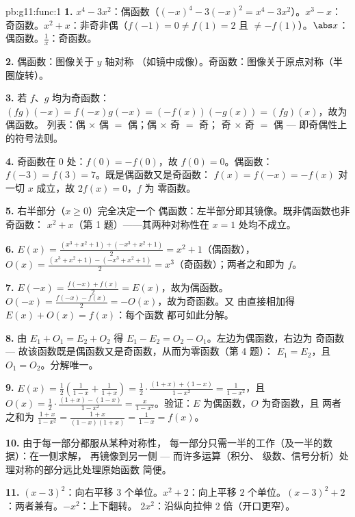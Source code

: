 \begin{solution}{pb:g11:func:1}
\textbf{1.} $x^4 - 3x^2$：偶函数（$(-x)^4 - 3(-x)^2 = x^4 -
3x^2$）。$x^3 - x$：奇函数。$x^2 + x$：非奇非偶（$f(-1) = 0 \neq
f(1) = 2$ 且 $\neq -f(1)$）。$\abs x$：偶函数。$\frac1x$：奇函数。

\textbf{2.} 偶函数：图像关于 $y$ 轴对称
（如镜中成像）。奇函数：图像关于原点对称（半圈旋转）。

\textbf{3.} 若 $f$、$g$ 均为奇函数：
$(fg)(-x) = f(-x)g(-x) = (-f(x))(-g(x)) = (fg)(x)$，故为偶函数。
列表：偶 $\times$ 偶 $=$ 偶；偶 $\times$ 奇 $=$ 奇；
奇 $\times$ 奇 $=$ 偶 --- 即奇偶性上的符号法则。

\textbf{4.} 奇函数在 $0$ 处：$f(0) = -f(0)$，故 $f(0) = 0$。偶函数：
$f(-3) = f(3) = 7$。既是偶函数又是奇函数：
$f(x) = f(-x) = -f(x)$ 对一切 $x$ 成立，故 $2f(x) = 0$，$f$ 为
零函数。

\textbf{5.} 右半部分（$x \geq 0$）完全决定一个
偶函数：左半部分即其镜像。既非偶函数也非奇函数：
$x^2 + x$（第 1 题）——其两种对称性在
$x = 1$ 处均不成立。

\textbf{6.} $E(x) = \frac{(x^3 + x^2 + 1) + (-x^3 + x^2 +
1)}{2} = x^2 + 1$（偶函数），$O(x) = \frac{(x^3 + x^2 + 1) -
(-x^3 + x^2 + 1)}{2} = x^3$（奇函数）；两者之和即为 $f$。

\textbf{7.} $E(-x) = \frac{f(-x) + f(x)}{2} = E(x)$，故为偶函数。
$O(-x) = \frac{f(-x) - f(x)}{2} = -O(x)$，故为奇函数。又
由直接相加得 $E(x) + O(x) = f(x)$：每个函数
都可如此分解。

\textbf{8.} 由 $E_1 + O_1 = E_2 + O_2$ 得
$E_1 - E_2 = O_2 - O_1$。左边为偶函数，右边为
奇函数 --- 故该函数既是偶函数又是奇函数，从而为零函数（第 4 题）：
$E_1 = E_2$，且 $O_1 = O_2$。分解唯一。

\textbf{9.} $E(x) = \frac12\left(\frac{1}{1 - x} + \frac{1}{1 +
x}\right) = \frac12 \cdot \frac{(1 + x) + (1 - x)}{1 - x^2}
= \frac{1}{1 - x^2}$，且
$O(x) = \frac12 \cdot \frac{(1 + x) - (1 - x)}{1 - x^2}
= \frac{x}{1 - x^2}$。验证：$E$ 为偶函数，$O$ 为奇函数，且
两者之和为 $\frac{1 + x}{1 - x^2} =
\frac{1 + x}{(1 - x)(1 + x)} = \frac{1}{1 - x} = f(x)$。

\textbf{10.} 由于每一部分都服从某种对称性，
每一部分只需一半的工作（及一半的数据）：在一侧求解，
再镜像到另一侧 --- 而许多运算（积分、
级数、信号分析）处理对称的部分远比处理原始函数
简便。

\textbf{11.} $(x-3)^2$：向右平移 $3$ 个单位。$x^2 + 2$：向上平移
$2$ 个单位。$(x-3)^2 + 2$：两者兼有。$-x^2$：上下翻转。
$2x^2$：沿纵向拉伸 $2$ 倍（开口更窄）。


\end{solution}
